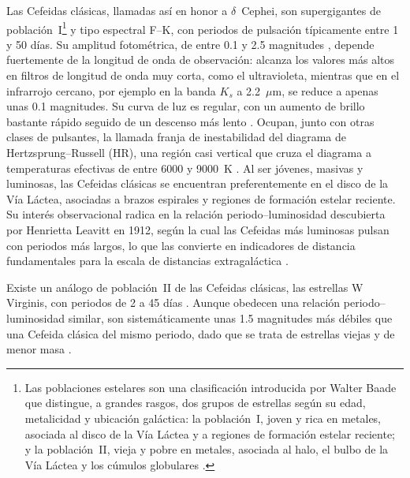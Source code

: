 \documentclass[12pt,letterpaper,oneside]{book}
\begin{document}
Las Cefeidas cl\'asicas, llamadas as\'i en honor a $\delta$~Cephei, son supergigantes de poblaci\'on~I\footnote{Las poblaciones estelares son una clasificaci\'on introducida por Walter Baade que distingue, a grandes rasgos, dos grupos de estrellas seg\'un su edad, metalicidad y ubicaci\'on gal\'actica: la poblaci\'on~I, joven y rica en metales, asociada al disco de la V\'ia L\'actea y a regiones de formaci\'on estelar reciente; y la poblaci\'on~II, vieja y pobre en metales, asociada al halo, el bulbo de la V\'ia L\'actea y los c\'umulos globulares \citep{Karttunen2016}.} y tipo espectral F--K, con periodos de pulsaci\'on t\'ipicamente entre 1 y 50 d\'ias. Su amplitud fotom\'etrica, de entre 0.1 y 2.5 magnitudes \citep{Karttunen2016}, depende fuertemente de la longitud de onda de observaci\'on: alcanza los valores m\'as altos en filtros de longitud de onda muy corta, como el ultravioleta, mientras que en el infrarrojo cercano, por ejemplo en la banda $K_s$ a 2.2~$\mu$m, se reduce a apenas unas 0.1 magnitudes. Su curva de luz es regular, con un aumento de brillo bastante r\'apido seguido de un descenso m\'as lento \citep{Karttunen2016}. Ocupan, junto con otras clases de pulsantes, la llamada franja de inestabilidad del diagrama de Hertzsprung--Russell (HR), una regi\'on casi vertical que cruza el diagrama a temperaturas efectivas de entre 6000 y 9000~K \citep{Karttunen2016}. Al ser j\'ovenes, masivas y luminosas, las Cefeidas cl\'asicas se encuentran preferentemente en el disco de la V\'ia L\'actea, asociadas a brazos espirales y regiones de formaci\'on estelar reciente. Su inter\'es observacional radica en la relaci\'on periodo--luminosidad descubierta por Henrietta Leavitt en 1912, seg\'un la cual las Cefeidas m\'as luminosas pulsan con periodos m\'as largos, lo que las convierte en indicadores de distancia fundamentales para la escala de distancias extragal\'actica \citep{Karttunen2016,Carroll2017}.

Existe un an\'alogo de poblaci\'on~II de las Cefeidas cl\'asicas, las estrellas W Virginis, con periodos de 2 a 45 d\'ias \citep{Carroll2017}. Aunque obedecen una relaci\'on periodo--luminosidad similar, son sistem\'aticamente unas 1.5 magnitudes m\'as d\'ebiles que una Cefeida cl\'asica del mismo periodo, dado que se trata de estrellas viejas y de menor masa \citep{Karttunen2016}.
\end{document}
